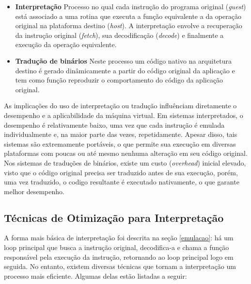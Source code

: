 \documentclass[11pt,twoside]{article}
\begin{document}
\begin{itemize}
 \item \textbf{Interpretação} Processo no qual cada instrução do programa original (\emph{guest}) está associado a uma rotina que executa a função equivalente a da operação original na plataforma destino (\emph{host}).
A interpretação envolve a recuperação da instrução original (\emph{fetch}), sua decodificação (\emph{decode}) e finalmente a execução da operação equivalente.
 \item \textbf{Tradução de binários} Neste processo um código nativo na arquitetura destino é gerado dinâmicamente a partir do código original da aplicação e tem como função reproduzir o comportamento do código da aplicação original\cite{Sites1993}. 
\end{itemize}

As implicações do uso de interpretação ou tradução influênciam diretamente o desempenho e a aplicabilidade da máquina virtual.
Em sistemas interpretados, o desempenho é relativamente baixo, uma vez que cada instrução é emulada individualmente e, na maior parte das vezes, repetidamente.
Apesar disso, tais sistemas são extremamente portáveis, o que permite sua execução em diversas plataformas com poucas ou até mesmo nenhuma alteração em seu código original.
Nos sistemas de traduções de binários, existe um custo (\emph{overhead}) inicial elevado, visto que o código original precisa ser traduzido antes de sua execução, porém, uma vez traduzido, o codigo resultante é executado nativamente, o que garante melhor desempenho.

\subsection{Técnicas de Otimização para Interpretação}

A forma mais básica de interpretação foi descrita na seção \ref{emulacao}: há um loop principal que busca a instrução original, decodifica-a e chama a função responsável pela execução da instrução, retornando ao loop principal logo em seguida. No entanto, existem diversas técnicas que tornam a interpretação um processo mais eficiente. Algumas delas estão listadas a seguir:
\end{document}

